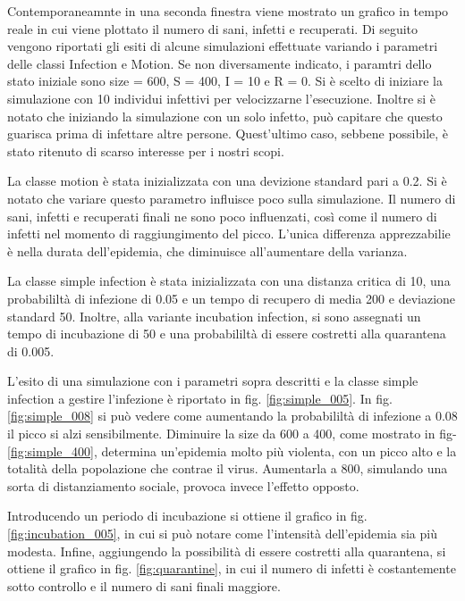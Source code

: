 \documentclass[a4paper,10pt,twocolumn]{article}
\begin{document}
Contemporaneamnte in una seconda finestra viene mostrato un grafico in tempo reale in cui viene plottato il numero di sani, infetti e recuperati. Di seguito vengono riportati gli esiti di alcune simulazioni effettuate variando i parametri delle classi Infection e Motion. Se non diversamente indicato, i paramtri  dello stato iniziale sono size = 600, S = 400, I = 10 e  R = 0. Si è scelto di iniziare la simulazione con 10 individui infettivi per velocizzarne l'esecuzione. Inoltre si è notato che iniziando la simulazione con un solo infetto, può capitare che questo guarisca prima di infettare altre persone. Quest'ultimo caso, sebbene possibile, è stato ritenuto di scarso interesse per i nostri scopi.

La classe motion è stata inizializzata con una devizione standard pari a 0.2. Si è notato che variare questo parametro influisce poco sulla simulazione. Il numero di sani, infetti e recuperati finali ne sono poco influenzati, così come il numero di infetti nel momento di raggiungimento del picco. L'unica differenza apprezzabilie è nella durata dell'epidemia, che diminuisce all'aumentare della varianza.

La classe simple infection è stata inizializzata con una distanza critica di 10, una probabililtà di infezione di 0.05 e un tempo di recupero di media 200 e deviazione standard 50. Inoltre, alla variante incubation infection, si sono assegnati un tempo di incubazione di 50 e una probabililtà di essere costretti alla quarantena di 0.005.

L'esito di una simulazione con i parametri sopra descritti e la classe simple infection a gestire l'infezione è riportato in fig. \ref{fig:simple_005}. In fig. \ref{fig:simple_008} si può vedere come aumentando la probabililtà di infezione a 0.08 il picco si alzi sensibilmente. Diminuire la size da 600 a 400, come mostrato in fig- \ref{fig:simple_400}, determina un'epidemia molto più violenta, con un picco alto e la totalità della popolazione che contrae il virus. Aumentarla a 800, simulando una sorta di distanziamento sociale, provoca invece l'effetto opposto.

Introducendo un periodo di incubazione si ottiene il grafico in fig. \ref{fig:incubation_005}, in cui si può notare come l'intensità dell'epidemia sia più modesta. Infine, aggiungendo la possibilità di essere costretti alla quarantena, si ottiene il grafico in fig. \ref{fig:quarantine}, in cui il numero di infetti è costantemente sotto controllo e il numero di sani finali maggiore.
\end{document}
